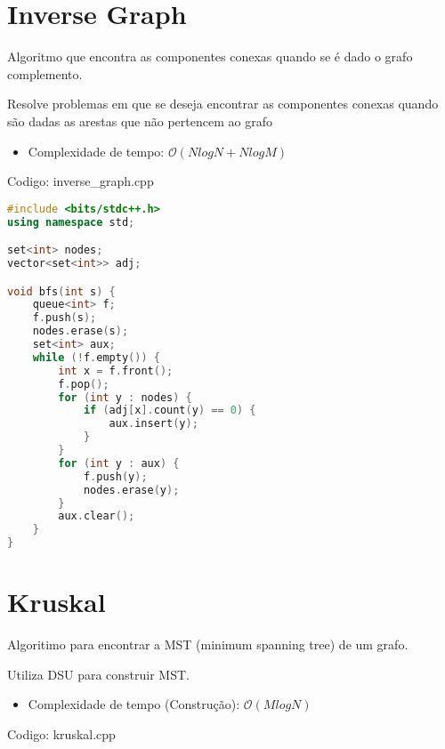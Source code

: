 \documentclass[10pt, a4paper, oneside]{book}
\begin{document}
\section{Inverse Graph}


Algoritmo que encontra as componentes conexas quando se é dado o grafo complemento.



Resolve problemas em que se deseja encontrar as componentes conexas quando são dadas as arestas que não pertencem ao grafo



\begin{itemize}
\item Complexidade de tempo: $\mathcal{O}(N log N + N log M)$
\end{itemize}

\hfill

Codigo: inverse\_graph.cpp

\begin{lstlisting}[language=C++]
#include <bits/stdc++.h>
using namespace std;

set<int> nodes;
vector<set<int>> adj;

void bfs(int s) {
    queue<int> f;
    f.push(s);
    nodes.erase(s);
    set<int> aux;
    while (!f.empty()) {
        int x = f.front();
        f.pop();
        for (int y : nodes) {
            if (adj[x].count(y) == 0) {
                aux.insert(y);
            }
        }
        for (int y : aux) {
            f.push(y);
            nodes.erase(y);
        }
        aux.clear();
    }
}
\end{lstlisting}
\hfill

\section{Kruskal}


Algoritimo para encontrar a MST (minimum spanning tree) de um grafo.



Utiliza DSU para construir MST.



\begin{itemize}
\item Complexidade de tempo (Construção): $\mathcal{O}(M log N)$
\end{itemize}

\hfill

Codigo: kruskal.cpp
\end{document}
